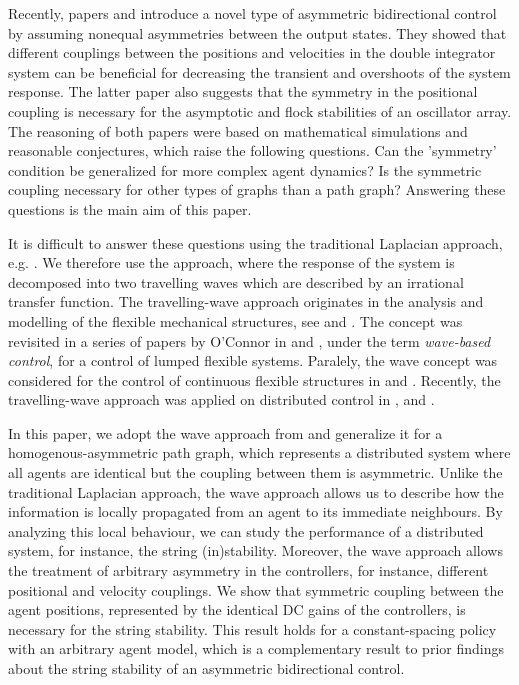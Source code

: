 \documentclass[10pt,twocolumn,twoside]{IEEEtran}
\theoremstyle{definition}
\begin{document}
Recently, papers \cite{Hao2012c} and \cite{Cantos2013} introduce a novel type of asymmetric bidirectional control by assuming nonequal asymmetries between the output states. They showed that different couplings between the positions and velocities in the double integrator system can be beneficial for decreasing the transient and overshoots of the system response. The latter paper also suggests that the symmetry in the positional coupling is necessary for the asymptotic and flock stabilities of an oscillator array. The reasoning of both papers were based on mathematical simulations and reasonable conjectures, which raise the following questions. Can the 'symmetry' condition be generalized for more complex agent dynamics? Is the symmetric coupling necessary for other types of graphs than a path graph? Answering these questions is the main aim of this paper.



It is difficult to answer these questions using the traditional Laplacian approach, e.g. \cite{Olfati-Saber2007}. We therefore use the approach, where the response of the system is decomposed into two travelling waves which are described by an irrational transfer function. The travelling-wave approach originates in the analysis and modelling of the flexible mechanical structures, see \cite{vaughan_application_1968} and \cite{Flotow1985}. The concept was revisited in a series of papers by O'Connor in \cite{OConnor2006} and \cite{OConnor2007}, under the term \emph{wave-based control}, for a control of lumped flexible systems. Paralely, the wave concept was considered for the control of continuous flexible structures in \cite{Halevi2005} and \cite{Halevi2006}. Recently, the travelling-wave approach was applied on distributed control in \cite{Martinec2014a}, \cite{Martinec2014c} and \cite{Martinec2015b}.


In this paper, we adopt the wave approach from \cite{Martinec2014a} and generalize it for a homogenous-asymmetric path graph, which represents a distributed system where all agents are identical but the coupling between them is asymmetric. Unlike the traditional Laplacian approach, the wave approach allows us to describe how the information is locally propagated from an agent to its immediate neighbours. By analyzing this local behaviour, we can study the performance of a distributed system, for instance, the string (in)stability. Moreover, the wave approach allows the treatment of arbitrary asymmetry in the controllers, for instance, different positional and velocity couplings. We show that symmetric coupling between the agent positions, represented by the identical DC gains of the controllers, is necessary for the string stability. This result holds for a constant-spacing policy with an arbitrary agent model, which is a complementary result to prior findings about the string stability of an asymmetric bidirectional control.
\end{document}
